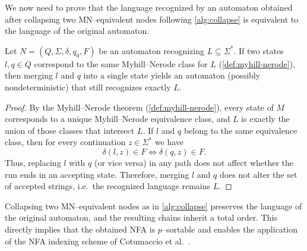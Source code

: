 
We now need to prove that the language recognized by an automaton obtained after collapsing two MN--equivalent nodes following \cref{alg:collapse} is equivalent to the language of the original automaton.

\begin{lemma} \label{lemma:language-eq}
Let $N=(Q,\Sigma,\delta,q_0,F)$ be an automaton recognizing $L \subseteq \Sigma^*$.
If two states $l,q \in Q$ correspond to the same Myhill--Nerode class for $L$ (\cref{def:myhill-nerode}), then merging $l$ and $q$ into a single state yields an automaton (possibly nondeterministic) that still recognizes exactly $L$.
\end{lemma}

\begin{proof}
By the Myhill--Nerode theorem (\cref{def:myhill-nerode}), every state of $M$ corresponds to a unique Myhill--Nerode equivalence class, and $L$ is exactly the union of those classes that intersect $L$.
If $l$ and $q$ belong to the same equivalence class, then for every continuation $z \in \Sigma^*$ we have
\[
\delta(l,z) \in F \iff \delta(q,z) \in F.
\]
Thus, replacing $l$ with $q$ (or vice versa) in any path does not affect whether the run ends in an accepting state. Therefore, merging $l$ and $q$ does not alter the set of accepted strings, i.e.\ the recognized language remains $L$.
\end{proof} 

Collapsing two MN--equivalent nodes as in \cref{alg:collapse} preserves the language of the original automaton, and the resulting chains inherit a total order. This 
directly implies that the obtained NFA is $p$--sortable and 
enables the application of the NFA indexing scheme of Cotumaccio et al.~\cite{cotumaccio2023co}.